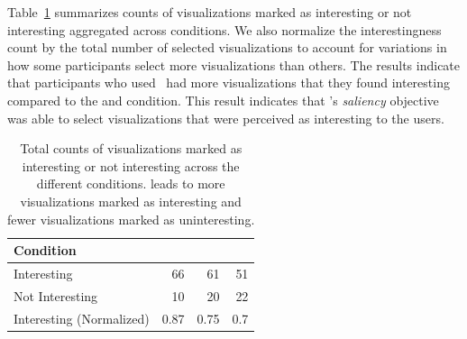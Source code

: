 Table~\ref{table:interestingScore} summarizes counts of visualizations marked as interesting or not interesting aggregated across conditions. We also normalize the interestingness count by the total number of selected visualizations to account for variations in how some participants select more visualizations than others. The results indicate that participants who used \system\ had more visualizations that they found interesting compared to the \BFS and \cluster condition. This result indicates that \system's \textit{saliency} objective was able to select visualizations that were perceived as interesting to the users.
\begin{table}[ht!]
	\centering
	\begin{tabular}{|l|rrr|}
	\hline
	 \small{Condition}             &   \small{\system} &   \small{\BFS} &   \small{\cluster} \\
	\hline
	 \small{Interesting}            &  \cellcolor{blue!25}       66    & 61    &      51   \\
	 \small{Not Interesting}        &  \cellcolor{blue!25}       10    & 20    &      22   \\
	 \small{Interesting (Normalized)} &   \cellcolor{blue!25}       0.87 &  0.75 &       0.7 \\
	\hline
	\end{tabular}
	\caption{Total counts of visualizations marked as interesting or not interesting across the different conditions. \system leads to more visualizations marked as interesting and fewer visualizations marked as uninteresting.}
	\label{table:interestingScore}
	\vspace{-10pt}
\end{table}
